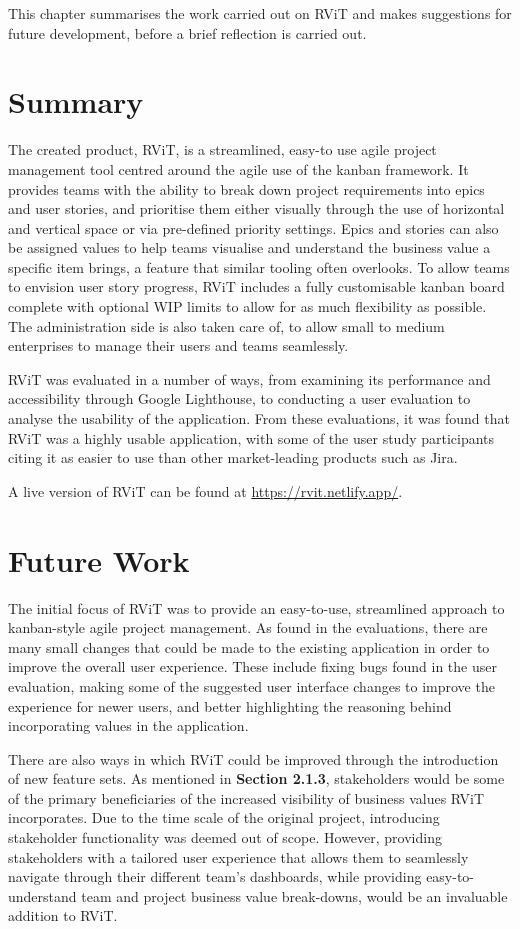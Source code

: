\documentclass[l4proj.tex]{subfiles}
\begin{document}
  


This chapter summarises the work carried out on RViT and makes suggestions for future development, before a brief reflection is carried out. 

\section{Summary}
The created product, RViT, is a streamlined, easy-to use agile project management tool centred around the agile use of the kanban framework. It provides teams with the ability to break down project requirements into epics and user stories, and prioritise them either visually through the use of horizontal and vertical space or via pre-defined priority settings. Epics and stories can also be assigned values to help teams visualise and understand the business value a specific item brings, a feature that similar tooling often overlooks. To allow teams to envision user story progress, RViT includes a fully customisable kanban board complete with optional WIP limits to allow for as much flexibility as possible. The administration side is also taken care of, to allow small to medium enterprises to manage their users and teams seamlessly.

RViT was evaluated in a number of ways, from examining its performance and accessibility through Google Lighthouse, to conducting a user evaluation to analyse the usability of the application. From these evaluations, it was found that RViT was a highly usable application, with some of the user study participants citing it as easier to use than other market-leading products such as Jira. 

A live version of RViT can be found at \url{https://rvit.netlify.app/}.

\section{Future Work}
The initial focus of RViT was to provide an easy-to-use, streamlined approach to kanban-style agile project management. As found in the evaluations, there are many small changes that could be made to the existing application in order to improve the overall user experience. These include fixing bugs found in the user evaluation, making some of the suggested user interface changes to improve the experience for newer users, and better highlighting the reasoning behind incorporating values in the application. 

There are also ways in which RViT could be improved through the introduction of new feature sets. As mentioned in \textbf{Section 2.1.3}, stakeholders would be some of the primary beneficiaries of the increased visibility of business values RViT incorporates. Due to the time scale of the original project, introducing stakeholder functionality was deemed out of scope. However, providing stakeholders with a tailored user experience that allows them to seamlessly navigate through their different team's dashboards, while providing easy-to-understand team and project business value break-downs, would be an invaluable addition to RViT.
\end{document}
